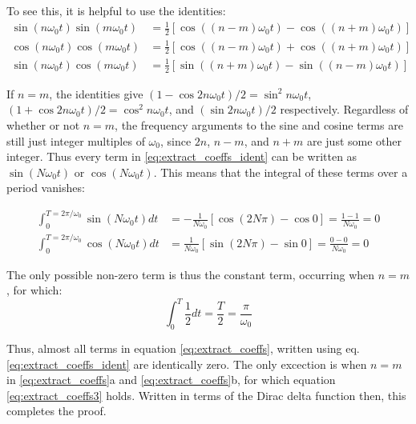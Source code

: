 \documentclass{article}
\begin{document}
To see this, it is helpful to use the identities:
\begin{subequations}
    \label{eq:extract_coeffs_ident}
    \begin{align}
        \sin \left(n\omega_0t\right)\sin \left(m\omega_0t\right) &= \frac{1}{2}\left[\cos( \left(n-m\right)\omega_0t) - \cos( \left(n+m\right)\omega_0t)\right] \\
        \cos \left(n\omega_0t\right)\cos \left(m\omega_0t\right) &= \frac{1}{2}\left[\cos( \left(n-m\right)\omega_0t) + \cos( \left(n+m\right)\omega_0t)\right] \\
        \sin \left(n\omega_0t\right)\cos \left(m\omega_0t\right) &= \frac{1}{2}\left[\sin( \left(n+m\right)\omega_0t) - \sin( \left(n-m\right)\omega_0t)\right]
    \end{align}
\end{subequations}

If $n=m$, the identities give $(1-\cos2n\omega_0 t)/2 = \sin^2n\omega_0t$, $(1+\cos2n\omega_0 t)/2 = \cos^2n\omega_0t$, and $(\sin2n\omega_0 t)/2$ respectively. Regardless of whether or not $n=m$, the frequency arguments to the sine and cosine terms are still just integer multiples of $\omega_0$, since $2n$, $n-m$, and $n+m$ are just some other integer. Thus every term in \ref{eq:extract_coeffs_ident} can be written as $\sin(N\omega_0t)$ or $\cos(N\omega_0t)$. This means that the integral of these terms over a period vanishes:

\begin{align*}
    \int_0^{T=2\pi/\omega_0}\sin(N\omega_0t)dt &= -\frac{1}{N\omega_0}\left[\cos\left(2N\pi\right) - \cos0\right] = \frac{1-1}{N\omega_0} = 0\\
    \int_0^{T=2\pi/\omega_0}\cos(N\omega_0t)dt &= \frac{1}{N\omega_0}\left[\sin\left(2N\pi\right) - \sin0\right] = \frac{0 - 0}{N\omega_0} = 0
\end{align*}

The only possible non-zero term is thus the constant term, occurring when $n=m$, for which:
\begin{equation}
    \label{eq:extract_coeffs3}
    \int_0^{T}\frac{1}{2}dt = \frac{T}{2} = \frac{\pi}{\omega_0}
\end{equation}

Thus, almost all terms in equation \ref{eq:extract_coeffs}, written using eq. \ref{eq:extract_coeffs_ident} are identically zero. The only excection is when $n=m$ in \ref{eq:extract_coeffs}a and \ref{eq:extract_coeffs}b, for which equation \ref{eq:extract_coeffs3} holds. Written in terms of the Dirac delta function then, this completes the proof.
\end{document}

